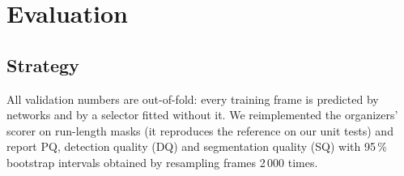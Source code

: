 \documentclass[sigconf]{acmart}
\begin{document}
\section{Evaluation}\label{sec:evaluation}

\subsection{Strategy}
    All validation numbers are out-of-fold: every training frame is predicted by networks and by a selector fitted without it. We reimplemented the organizers' scorer on run-length masks (it reproduces the reference on our unit tests) and report PQ, detection quality (DQ) and segmentation quality (SQ) with 95\,\% bootstrap intervals obtained by resampling frames 2\,000 times.

\begin{table}[t]
    \caption{Out-of-fold results on the \nFrames{} training frames, with 95\,\% bootstrap intervals for PQ.}
    \label{tab:main}
    \small
    
\end{table}

\begin{table}[t]
    \caption{What each component contributes (out-of-fold PQ).}
    \label{tab:ablation}
    \small
    
\end{table}

\begin{table}[t]
    \caption{Out-of-fold PQ by observing site of the GONG network.}
    \label{tab:sites}
    \small
    
\end{table}
\end{document}
